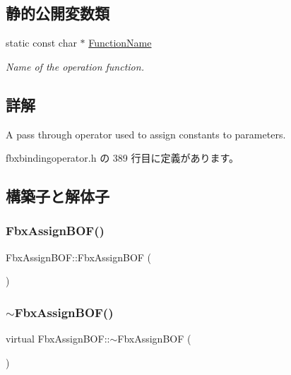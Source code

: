 \subsection*{静的公開変数類}
\begin{DoxyCompactItemize}
\item 
static const char $\ast$ \hyperlink{class_fbx_assign_b_o_f_a65ac910c4b20983717f7556ae8ee7a27}{Function\+Name}
\begin{DoxyCompactList}\small\item\em Name of the operation function. \end{DoxyCompactList}\end{DoxyCompactItemize}


\subsection{詳解}
A pass through operator used to assign constants to parameters. 

 fbxbindingoperator.\+h の 389 行目に定義があります。



\subsection{構築子と解体子}
\mbox{\label{class_fbx_assign_b_o_f_a4bc01f55fb7c8103bd2170ca033ec77b}} 
\subsubsection{\texorpdfstring{Fbx\+Assign\+B\+O\+F()}{FbxAssignBOF()}}
{\footnotesize\ttfamily Fbx\+Assign\+B\+O\+F\+::\+Fbx\+Assign\+B\+OF (\begin{DoxyParamCaption}{ }\end{DoxyParamCaption})}

\mbox{\label{class_fbx_assign_b_o_f_ae9e45cfddb130ed0b5758c50be05f11d}} 
\subsubsection{\texorpdfstring{$\sim$\+Fbx\+Assign\+B\+O\+F()}{~FbxAssignBOF()}}
{\footnotesize\ttfamily virtual Fbx\+Assign\+B\+O\+F\+::$\sim$\+Fbx\+Assign\+B\+OF (\begin{DoxyParamCaption}{ }\end{DoxyParamCaption})\hspace{0.3cm}{\ttfamily [virtual]}}




